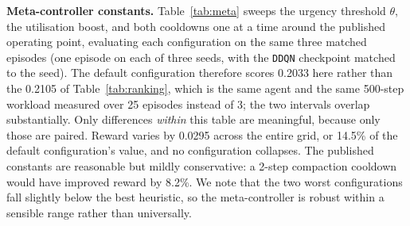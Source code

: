 \documentclass[fleqn,10pt]{wlscirep}
\newcommand{\ddqn}{\texttt{DDQN}}
\begin{document}
\textbf{Meta-controller constants.}
Table~\ref{tab:meta} sweeps the urgency threshold $\theta$, the
utilisation boost, and both cooldowns one at a time around the published
operating point, evaluating each configuration on the same three matched
episodes (one episode on each of three seeds, with the \ddqn{}
checkpoint matched to the seed). The default configuration therefore
scores 0.2033 here rather than the 0.2105 of Table~\ref{tab:ranking},
which is the same agent and the same 500-step workload measured over 25
episodes instead of 3; the two intervals overlap substantially. Only
differences \emph{within} this table are meaningful, because only those
are paired. Reward varies by 0.0295 across the entire grid, or 14.5\% of
the default configuration's value, and no configuration collapses.
The published constants are reasonable but mildly conservative: a
2-step compaction cooldown would have improved reward by 8.2\%. We note
that the two worst configurations fall slightly below the best
heuristic, so the meta-controller is robust within a sensible range
rather than universally.
\end{document}
